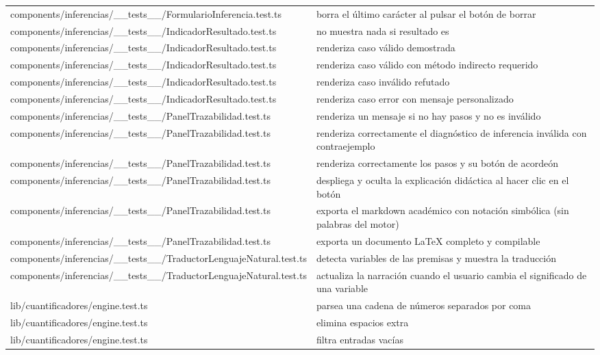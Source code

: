 \documentclass[11pt,a4paper,openany]{book}
\begin{document}
\begin{center}
\begin{longtable}{ll}
components/inferencias/\_\_tests\_\_/FormularioInferencia.test.ts & borra el último carácter al pulsar el botón de borrar \\
components/inferencias/\_\_tests\_\_/IndicadorResultado.test.ts & no muestra nada si resultado es \\
components/inferencias/\_\_tests\_\_/IndicadorResultado.test.ts & renderiza caso válido demostrada \\
components/inferencias/\_\_tests\_\_/IndicadorResultado.test.ts & renderiza caso válido con método indirecto requerido \\
components/inferencias/\_\_tests\_\_/IndicadorResultado.test.ts & renderiza caso inválido refutado \\
components/inferencias/\_\_tests\_\_/IndicadorResultado.test.ts & renderiza caso error con mensaje personalizado \\
components/inferencias/\_\_tests\_\_/PanelTrazabilidad.test.ts & renderiza un mensaje si no hay pasos y no es inválido \\
components/inferencias/\_\_tests\_\_/PanelTrazabilidad.test.ts & renderiza correctamente el diagnóstico de inferencia inválida con contraejemplo \\
components/inferencias/\_\_tests\_\_/PanelTrazabilidad.test.ts & renderiza correctamente los pasos y su botón de acordeón \\
components/inferencias/\_\_tests\_\_/PanelTrazabilidad.test.ts & despliega y oculta la explicación didáctica al hacer clic en el botón \\
components/inferencias/\_\_tests\_\_/PanelTrazabilidad.test.ts & exporta el markdown académico con notación simbólica (sin palabras del motor) \\
components/inferencias/\_\_tests\_\_/PanelTrazabilidad.test.ts & exporta un documento LaTeX completo y compilable \\
components/inferencias/\_\_tests\_\_/TraductorLenguajeNatural.test.ts & detecta variables de las premisas y muestra la traducción \\
components/inferencias/\_\_tests\_\_/TraductorLenguajeNatural.test.ts & actualiza la narración cuando el usuario cambia el significado de una variable \\
lib/cuantificadores/engine.test.ts & parsea una cadena de números separados por coma \\
lib/cuantificadores/engine.test.ts & elimina espacios extra \\
lib/cuantificadores/engine.test.ts & filtra entradas vacías \\

\end{longtable}
\end{center}
\end{document}
